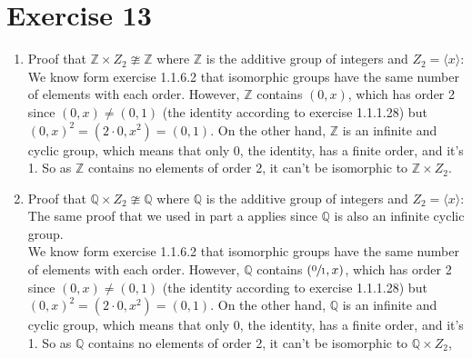 \documentclass{article}
\newcommand{\Z}{\mathbb{Z}}
\newcommand{\Q}{\mathbb{Q}}
\begin{document}
    \section*{Exercise 13}
    \begin{enumerate}[label=\textbf{\alph*.}]
        \item 
            Proof that $\Z \times Z_2 \ncong \Z$
            where $\Z$ is the additive group of integers
            and $Z_2 = \langle x \rangle$: \\
            We know form exercise 1.1.6.2 that isomorphic
            groups have the same number of elements with each order.
            However, $\Z$ contains $(0, x)$, which has order 2
            since $(0, x) \neq (0, 1)$
            (the identity according to exercise 1.1.1.28)
            but $(0, x)^2 = (2 \cdot 0, x^2) = (0, 1)$.
            On the other hand, $\Z$ is an infinite and cyclic
            group, which means that only 0, the identity,
            has a finite order, and it's 1.
            So as $\Z$ contains no elements of order 2,
            it can't be isomorphic to $\Z \times Z_2$.
        \item
            Proof that $\Q \times Z_2 \ncong \Q$
            where $\Q$ is the additive group of integers
            and $Z_2 = \langle x \rangle$: \\
            The same proof that we used in part a applies
            since $\Q$ is also an infinite cyclic group. \\
            We know form exercise 1.1.6.2 that isomorphic
            groups have the same number of elements with each order.
            However, $\Q$ contains $(\sfrac{0}{1}, x)$,
            which has order 2
            since $(0, x) \neq (0, 1)$
            (the identity according to exercise 1.1.1.28)
            but $(0, x)^2 = (2 \cdot 0, x^2) = (0, 1)$.
            On the other hand, $\Q$ is an infinite and cyclic
            group, which means that only 0, the identity,
            has a finite order, and it's 1.
            So as $\Q$ contains no elements of order 2,
            it can't be isomorphic to $\Q \times Z_2$,
    \end{enumerate}
\end{document}
